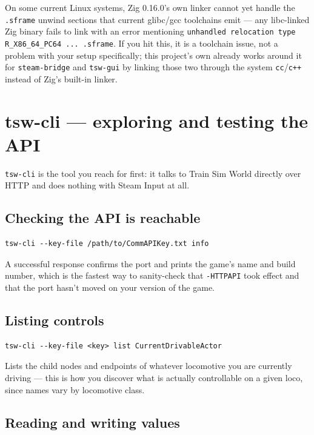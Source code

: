 \documentclass[11pt,a4paper]{article}
\newcommand{\code}[1]{\texttt{#1}}
\begin{document}
On some current Linux systems, Zig 0.16.0's own linker cannot yet handle
the \code{.sframe} unwind sections that current glibc/gcc toolchains emit
--- any libc-linked Zig binary fails to link with an error mentioning
\code{unhandled relocation type R\_X86\_64\_PC64 ... .sframe}. If you hit
this, it is a toolchain issue, not a problem with your setup specifically;
this project's own  already works around it for
\code{steam-bridge} and \code{tsw-gui} by linking those two through the
system \code{cc}/\code{c++} instead of Zig's built-in linker.

\section{tsw-cli --- exploring and testing the API}
\label{sec:cli-info}

\code{tsw-cli} is the tool you reach for first: it talks to Train Sim
World directly over HTTP and does nothing with Steam Input at all.

\subsection{Checking the API is reachable}

\begin{lstlisting}
tsw-cli --key-file /path/to/CommAPIKey.txt info
\end{lstlisting}

A successful response confirms the port and prints the game's name and
build number, which is the fastest way to sanity-check that
\code{-HTTPAPI} took effect and that the port hasn't moved on your version
of the game.

\subsection{Listing controls}

\begin{lstlisting}
tsw-cli --key-file <key> list CurrentDrivableActor
\end{lstlisting}

Lists the child nodes and endpoints of whatever locomotive you are
currently driving --- this is how you discover what is actually
controllable on a given loco, since names vary by locomotive class.

\subsection{Reading and writing values}
\end{document}
